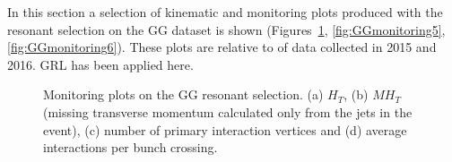 In this section a selection of kinematic and monitoring plots produced with the resonant selection on the GG dataset is shown 
(Figures~\ref{fig:GGmonitoring1},  
\ref{fig:GGmonitoring5}, \ref{fig:GGmonitoring6}). These plots are relative to \integLumi of data collected in 2015 and 2016.
 GRL has been applied here.

\begin{figure}[htb]
 \centering

 \caption{Monitoring plots on %
 the GG resonant selection. (a) $H_T$, (b) $MH_T$ (missing transverse momentum calculated only from the jets in the event), (c) number of primary interaction vertices and (d) average interactions per bunch crossing.}
 \label{fig:GGmonitoring1}
\end{figure}

